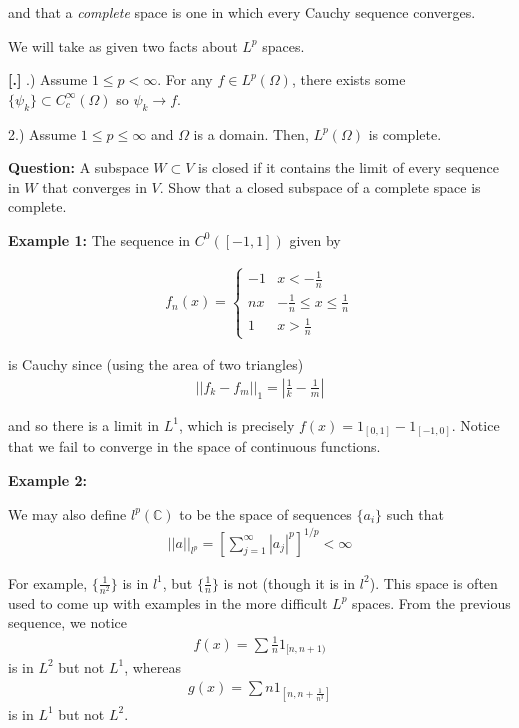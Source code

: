\documentclass{article}
\newcommand{\C}{{\mathbb{C}}}
\newcommand{ \norm }[1]{{ || {#1}||}}
\newcounter{result}[section]
\newenvironment{res}[1][]{\refstepcounter{result}\par\medskip
	\noindent \textbf{[\thesection.\theresult] #1} \rmfamily}{\medskip}
\begin{document}
	and that a \textit{complete} space is one in which every Cauchy sequence converges. 
	
	We will take as given two facts about $L^{p}$ spaces. 
	
	\begin{res}
		1.) Assume $1 \leq p < \infty$. For any $f \in L^{p}(\Omega)$, there exists some $\{\psi_{k}\} \subset C_{c}^{\infty}(\Omega)$ so $\psi_{k} \to f$. 
		
		2.) Assume $1 \leq p \leq \infty$ and $\Omega$ is a domain. Then, $L^{p}(\Omega)$ is complete.
	\end{res}
	
	\textbf{Question:} A subspace $W \subset V$ is closed if it contains the limit of every sequence in $W$ that converges in $V$. Show that a closed subspace of a complete space is complete. 
	
	\vspace{0.25cm}
	
	\textbf{Example 1:} 
	The sequence in $C^{0}([-1,1])$ given by
	
	\begin{align*}
		f_{n}(x) = \begin{cases}
			-1 & x < -\frac{1}{n}\\
			nx & -\frac{1}{n} \leq x \leq \frac{1}{n} \\
			1 & x >  \frac{1}{n}
		\end{cases}
	\end{align*}
	
	is Cauchy since (using the area of two triangles)
	\begin{align*}
		\norm{f_{k} - f_{m}}_{1} = |\frac{1}{k} - \frac{1}{m}|
	\end{align*}
	
	and so there is a limit in $L^{1}$, which is precisely $f(x) = 1_{[0,1]} - 1_{[-1,0]}$. Notice that we fail to converge in the space of continuous functions. 
	
	\vspace{0.25 cm}
	
	\textbf{Example 2:}
	
	We may also define $l^{p}(\C)$ to be the space of sequences $\{a_i\}$ such that 
	\begin{align*}
		\norm{a}_{l^{p}} = \left[ \sum_{j=1}^{\infty} |a_{j}|^{p}\right]^{1/p} < \infty
	\end{align*}
	
	For example, $\{\frac{1}{n^{2}}\}$ is in $l^1$, but $\{\frac{1}{n}\}$ is not (though it is in $l^{2}$). This space is often used to come up with examples in the more difficult $L^{p}$ spaces. From the previous sequence, we notice 
	\begin{align*}
		f(x) = \sum \frac{1}{n} 1_{[n,n+1)}
	\end{align*}
	is in $L^{2}$ but not $L^{1}$, whereas
	\begin{align*}
		g(x) = \sum n 1_{[n,n + \frac{1}{n^{3}}]}
	\end{align*}
	is in $L^{1}$ but not $L^{2}$. 
	
\end{document}

